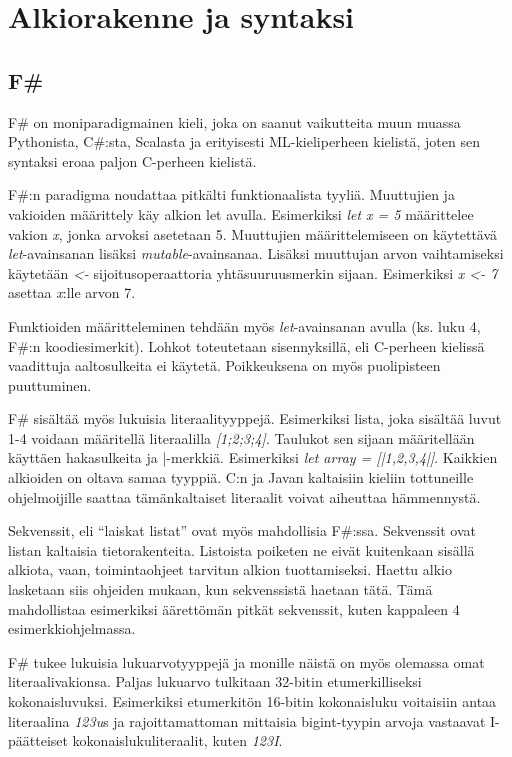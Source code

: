 \section{Alkiorakenne ja syntaksi}

\subsection{F\#}
F\# on moniparadigmainen kieli, joka on saanut vaikutteita muun muassa Pythonista, C\#:sta, Scalasta ja erityisesti ML-kieliperheen kielistä, joten sen syntaksi eroaa paljon C-perheen kielistä.

F\#:n paradigma noudattaa pitkälti funktionaalista tyyliä.
Muuttujien ja vakioiden määrittely käy alkion let avulla. Esimerkiksi \textit{let x = 5} määrittelee vakion \textit{x}, jonka arvoksi asetetaan 5. Muuttujien määrittelemiseen on käytettävä \textit{let}-avainsanan lisäksi \textit{mutable}-avainsanaa. Lisäksi muuttujan arvon vaihtamiseksi käytetään \textit{<-} sijoitusoperaattoria yhtäsuuruusmerkin sijaan. Esimerkiksi \textit{x <- 7} asettaa \textit{x}:lle arvon 7.

Funktioiden määritteleminen tehdään myös \textit{let}-avainsanan avulla (ks. luku 4, F\#:n koodiesimerkit). Lohkot toteutetaan sisennyksillä, eli C-perheen kielissä vaadittuja aaltosulkeita ei käytetä. Poikkeuksena on myös puolipisteen puuttuminen.

F\# sisältää myös lukuisia literaalityyppejä. Esimerkiksi lista, joka sisältää luvut 1-4 voidaan määritellä literaalilla \textit{[1;2;3;4]}. Taulukot sen sijaan määritellään käyttäen hakasulkeita ja |-merkkiä. Esimerkiksi \textit{let array = [|1,2,3,4|]}. Kaikkien alkioiden on oltava samaa tyyppiä. C:n ja Javan kaltaisiin kieliin tottuneille ohjelmoijille saattaa tämänkaltaiset literaalit voivat aiheuttaa hämmennystä.

Sekvenssit, eli “laiskat listat” ovat myös mahdollisia F\#:ssa. Sekvenssit ovat listan kaltaisia tietorakenteita. Listoista poiketen ne eivät kuitenkaan sisällä alkiota, vaan, toimintaohjeet tarvitun alkion tuottamiseksi. Haettu alkio lasketaan siis ohjeiden mukaan, kun sekvenssistä haetaan tätä. Tämä mahdollistaa esimerkiksi äärettömän pitkät sekvenssit, kuten kappaleen 4 esimerkkiohjelmassa.  
    
F\# tukee lukuisia lukuarvotyyppejä ja monille näistä on myös olemassa omat literaalivakionsa. Paljas lukuarvo tulkitaan 32-bitin etumerkilliseksi kokonaisluvuksi. Esimerkiksi etumerkitön 16-bitin kokonaisluku voitaisiin antaa literaalina \textit{123u}s ja rajoittamattoman mittaisia bigint-tyypin arvoja vastaavat I-päätteiset kokonaislukuliteraalit, kuten \textit{123I}.

